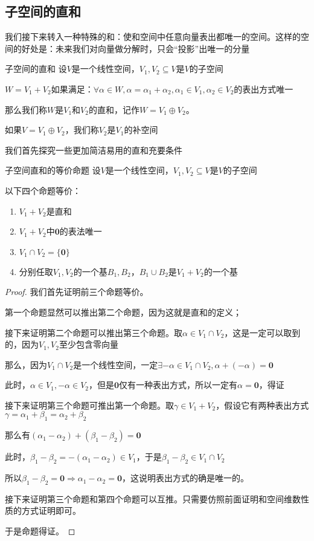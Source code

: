 \documentclass[12pt, a4paper, oneside, UTF8]{ctexbook}
\begin{document}
		\subsection{子空间的直和}
			我们接下来转入一种特殊的和：使和空间中任意向量表出都唯一的空间。这样的空间的好处是：未来我们对向量做分解时，只会“投影”出唯一的分量
			\begin{defn}{子空间的直和}{}
				设$V$是一个线性空间，$V_1,V_2 \subseteq V$是$V$的子空间

				$W=V_1+V_2$如果满足：$\forall \alpha \in W,\alpha =\alpha_1+\alpha_2,\alpha_1 \in V_1,\alpha_2 \in V_2$的表出方式唯一

				那么我们称$W$是$V_1$和$V_2$的直和，记作$W=V_1 \oplus V_2$。
				
				如果$V=V_1 \oplus V_2$，我们称$V_2$是$V_1$的补空间
			\end{defn}
			我们首先探究一些更加简洁易用的直和充要条件
			\begin{them}{子空间直和的等价命题}{}
				设$V$是一个线性空间，$V_1,V_2 \subseteq V$是$V$的子空间

				以下四个命题等价：

				\begin{enumerate}
					\item $V_1+V_2$是直和
					\item $V_1+V_2$中$\mathbf{0}$的表法唯一
					\item $V_1 \cap V_2 = \{\mathbf{0}\}$
					\item 分别任取$V_1,V_2$的一个基$B_1,B_2$，$B_1 \cup B_2$是$V_1+V_2$的一个基
				\end{enumerate}
			\end{them}
			\begin{proof}
				我们首先证明前三个命题等价。

				第一个命题显然可以推出第二个命题，因为这就是直和的定义；

				接下来证明第二个命题可以推出第三个命题。取$\alpha \in V_1 \cap V_2$，这是一定可以取到的，因为$V_1,V_2$至少包含零向量

				那么，因为$V_1 \cap V_2$是一个线性空间，一定$\exists -\alpha \in V_1 \cap V_2 ,\alpha +(-\alpha )=\mathbf{0}$

				此时，$\alpha \in V_1,-\alpha \in V_2$，但是$\mathbf{0}$仅有一种表出方式，所以一定有$\alpha =\mathbf{0}$，得证

				接下来证明第三个命题可推出第一个命题。取$\gamma \in V_1+V_2$，假设它有两种表出方式$\gamma =\alpha_1+\beta_1=\alpha_2+\beta_2$
			
				那么有$(\alpha_1-\alpha_2)+(\beta_1-\beta_2)=\mathbf{0}$

				此时，$\beta_1-\beta_2=-(\alpha_1-\alpha_2) \in V_1$，于是$\beta_1 - \beta_2 \in V_1 \cap V_2$

				所以$\beta_1-\beta_2 = \mathbf{0} \Rightarrow \alpha_1 - \alpha_2 = \mathbf{0}$，这说明表出方式的确是唯一的。

				接下来证明第三个命题和第四个命题可以互推。只需要仿照前面证明和空间维数性质的方式证明即可。

				于是命题得证。
			\end{proof}
\end{document}
